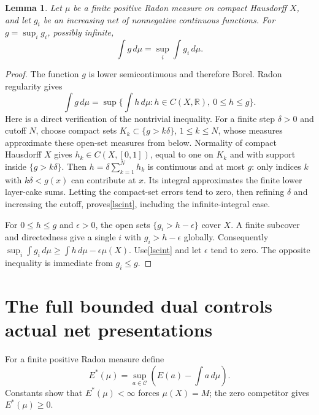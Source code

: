 \documentclass[11pt]{article}
\newcommand{\C}{\mathcal C}
\newcommand{\RR}{\mathbb R}
\newtheorem{lemma}[theorem]{Lemma}
\theoremstyle{remark}\newtheorem{remark}[theorem]{Remark}
\begin{document}
\begin{lemma}\label{radon}
Let $\mu$ be a finite positive Radon measure on compact Hausdorff
$X$, and let $g_i$ be an increasing net of nonnegative continuous
functions. For $g=\sup_i g_i$, possibly infinite,
\[
 \int g\,d\mu=\sup_i\int g_i\,d\mu.
\]
\end{lemma}
\begin{proof}
The function $g$ is lower semicontinuous and therefore Borel.
Radon regularity gives
\begin{equation}\label{lscint}
 \int g\,d\mu=
 \sup\{\int h\,d\mu:h\in C(X,\RR),\ 0\le h\le g\}.
\end{equation}
Here is a direct verification of the nontrivial inequality.
For a finite step $\delta>0$ and cutoff $N$, choose compact sets
$K_k\subset\{g>k\delta\}$, $1\le k\le N$, whose measures
approximate these open-set measures from below. Normality of
compact Hausdorff $X$ gives $h_k\in C(X,[0,1])$, equal to one
on $K_k$ and with support inside $\{g>k\delta\}$.
Then $h=\delta\sum_{k=1}^N h_k$ is continuous and at most $g$:
only indices $k$ with $k\delta<g(x)$ can contribute at $x$.
Its integral approximates the finite lower layer-cake sums.
Letting the compact-set errors tend to zero, then refining
$\delta$ and increasing the cutoff, proves\eqref{lscint},
including the infinite-integral case.

For $0\le h\le g$ and $\epsilon>0$, the open sets
$\{g_i>h-\epsilon\}$ cover $X$. A finite subcover and
directedness give a single $i$ with $g_i>h-\epsilon$ globally.
Consequently $\sup_i\int g_i\,d\mu\ge\int h\,d\mu-
\epsilon\mu(X)$. Use\eqref{lscint} and let $\epsilon$ tend to
zero. The opposite inequality is immediate from $g_i\le g$.
\end{proof}

\section{The full bounded dual controls actual net presentations}
For a finite positive Radon measure define
\[
 E^*(\mu)=\sup_{a\in\C}\left(E(a)-\int a\,d\mu\right).
\]
Constants show that $E^*(\mu)<\infty$ forces $\mu(X)=M$;
the zero competitor gives $E^*(\mu)\ge0$.
\end{document}

